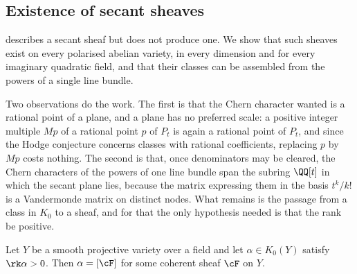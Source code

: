 \subsection{Existence of secant sheaves}\label{ssec:thirdexists}

 describes a secant sheaf but does not produce one.
We show that such sheaves exist on every polarised abelian variety, in
every dimension and for every imaginary quadratic field, and that their
classes can be assembled from the powers of a single line bundle.

Two observations do the work. The first is that the Chern character wanted is
a rational point of a plane, and a plane has no preferred scale: a positive
integer multiple $Mp$ of a rational point $p$ of $P_{t}$ is again a rational
point of $P_{t}$, and since the Hodge conjecture concerns classes with
rational coefficients, replacing $p$ by $Mp$ costs nothing. The second is
that, once denominators may be cleared, the Chern characters of the powers of
one line bundle span the subring $\QQ[t]$ in which the secant plane lies,
because the matrix expressing them in the basis $t^{k}/k!$ is a Vandermonde
matrix on distinct nodes. What remains is the passage from a class in $K_{0}$
to a sheaf, and for that the only hypothesis needed is that the rank be
positive.

\begin{lemma}\label{lem:posrank}
Let $Y$ be a smooth projective variety over a field and let $\alpha\in
K_{0}(Y)$ satisfy $\rk\alpha>0$. Then $\alpha=[\cF]$ for some coherent sheaf
$\cF$ on $Y$.
\end{lemma}

